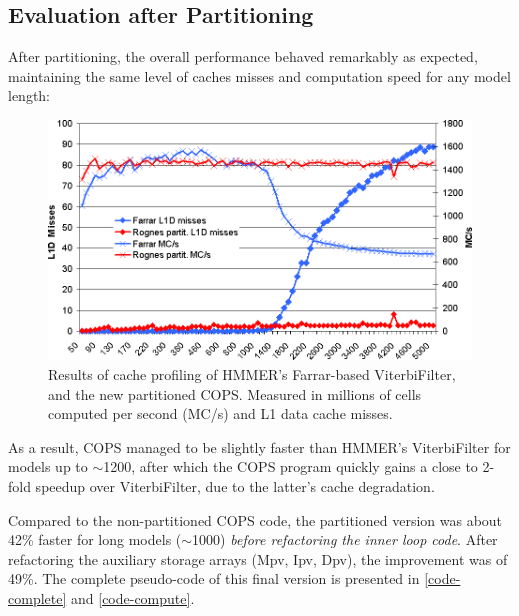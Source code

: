 


\subsection{Evaluation after Partitioning}

After partitioning, the overall performance behaved remarkably as expected, maintaining the same level of caches misses and computation speed for any model length:

\begin{figure}[h!]
	\centering
	\includegraphics[width=16cm]{graphics/cache-misses-part.png} 
	\caption[Partitioning performance results] {Results of cache profiling of HMMER's Farrar-based ViterbiFilter, and the new partitioned COPS. Measured in millions of cells computed per second (MC/s) and L1 data cache misses.}
	\label{cache-misses-part}
\end{figure}

As a result, COPS managed to be slightly faster than HMMER's ViterbiFilter for models up to $\sim$1200, after which the COPS program quickly gains a close to 2-fold speedup over ViterbiFilter, due to the latter's cache degradation.

Compared to the non-partitioned COPS code, the partitioned version was about 42\% faster for long models ($\sim$1000) \emph{before refactoring the inner loop code}. After refactoring the auxiliary storage arrays (Mpv, Ipv, Dpv), the improvement was of 49\%. The complete pseudo-code of this final version is presented in \cref{code-complete} and \cref{code-compute}.




